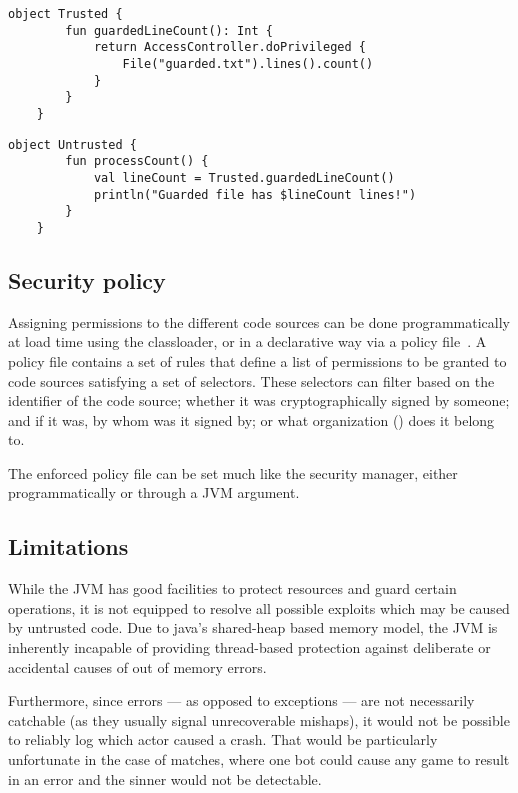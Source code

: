 	\begin{center}
		\begin{minipage}{12cm}
		\begin{lstlisting}[title={\code{Trusted.kt}}]
	object Trusted {
		fun guardedLineCount(): Int {
			return AccessController.doPrivileged {
				File("guarded.txt").lines().count()
			}
		}
	}
		\end{lstlisting}
	
		\begin{lstlisting}[title={\code{Untrusted.kt}}]
	object Untrusted {
		fun processCount() {
			val lineCount = Trusted.guardedLineCount()
			println("Guarded file has $lineCount lines!")
		}
	}
		\end{lstlisting}
		\end{minipage}
	\end{center}

	\subsection{Security policy}
	
	Assigning permissions to the different code sources can be done programmatically at load time using the classloader, or in a declarative way via a policy file~\cite{JavaPermissionsPolicy}. A policy file contains a set of rules that define a list of permissions to be granted to code sources satisfying a set of selectors. These selectors can filter based on the identifier of the code source; whether it was cryptographically signed by someone; and if it was, by whom was it signed by; or what organization () does it belong to.
	
	The enforced policy file can be set much like the security manager, either programmatically or through a JVM argument. 

	\subsection{Limitations}
	
	While the JVM has good facilities to protect resources and guard certain operations, it is not equipped to resolve all possible exploits which may be caused by untrusted code. Due to java's shared-heap based memory model, the JVM is inherently incapable of providing thread-based protection against deliberate or accidental causes of out of memory errors.
	
	Furthermore, since errors --- as opposed to exceptions --- are not necessarily catchable (as they usually signal unrecoverable mishaps), it would not be possible to reliably log which actor caused a crash. That would be particularly unfortunate in the case of matches, where one bot could cause any game to result in an error and the sinner would not be detectable.

